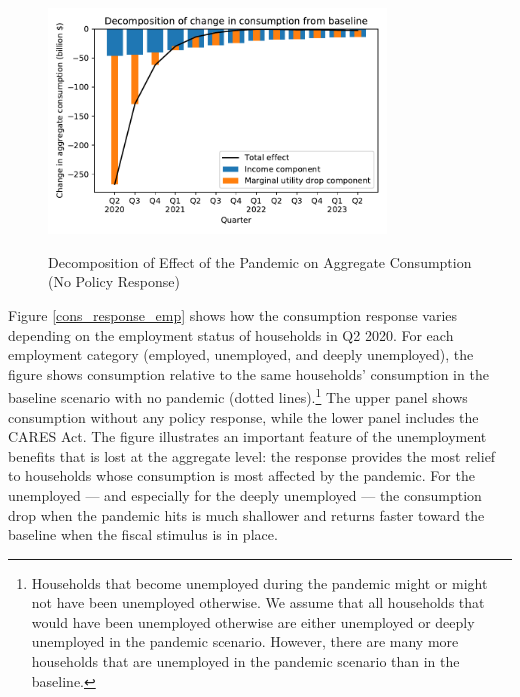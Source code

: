 \documentclass[titlepage,letterpaper]{\econtex}
\begin{document}
\begin{figure}
  \centering
  \caption{Decomposition of Effect of the Pandemic on Aggregate Consumption (No Policy Response)}
  \label{cons_response2}
  { \includegraphics[width=0.8\textwidth]{./Figures/Decomposition}}
\end{figure}

Figure \ref{cons_response_emp} shows how the consumption response varies depending on the employment status of households in Q2 2020.
For each employment category (employed, unemployed, and deeply unemployed), the figure shows consumption relative to the same households' consumption in the baseline scenario with no pandemic (dotted lines).\footnote{Households that become unemployed during the pandemic might or might not have been unemployed otherwise. We assume that all households that would have been unemployed otherwise are either unemployed or deeply unemployed in the pandemic scenario. However, there are many more households that are unemployed in the pandemic scenario than in the baseline.}
The upper panel shows consumption without any policy response, while the lower panel includes the CARES Act.
The figure illustrates an important feature of the unemployment benefits that is lost at the aggregate level: the response provides the most relief to households whose consumption is most affected by the pandemic.
For the unemployed --- and especially for the deeply unemployed --- the consumption drop when the pandemic hits is much shallower and returns faster toward the baseline when the fiscal stimulus is in place.
\end{document}
